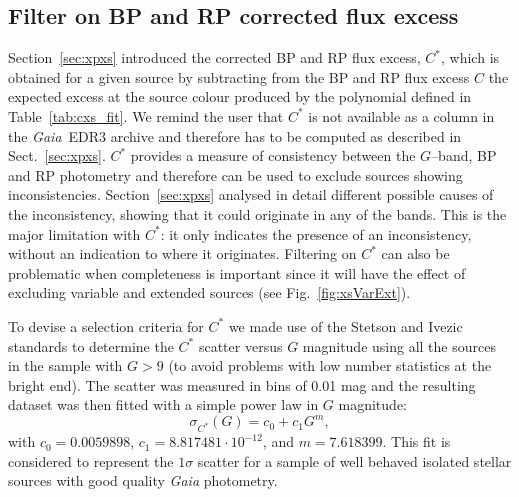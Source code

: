 \documentclass{aa}
\newcommand{\gaia}{\textit{Gaia}\xspace}
\newcommand{\gband}{$G$--band\xspace}
\newcommand{\cxs}{\ensuremath{C^{\ast}}\xspace}
\newcommand{\edr}{\gaia~EDR3\xspace}
\newcommand{\xp}{BP and RP\xspace}
\newcommand{\secname}{Sect.}
\newcommand{\secref}[1]{\secname~\ref{sec:#1}}
\newcommand{\asecref}[1]{Section~\ref{sec:#1}}
\newcommand{\figref}[1]{Fig.~\ref{fig:#1}}
\newcommand{\tabref}[1]{Table~\ref{tab:#1}}
\begin{document}
\subsection{Filter on \xp corrected flux excess}\label{sec:quality:cxs}

\asecref{xpxs} introduced the corrected \xp flux excess, \cxs, which is obtained for a given source by subtracting from the \xp flux excess $C$ \citep[see][]{Phot_DR2} the expected excess at the source colour produced by the polynomial defined in \tabref{cxs_fit}. We remind the user that \cxs is not available as a column in the \edr archive and therefore has to be computed as described in \secref{xpxs}. \cxs provides a measure of consistency between the \gband, BP and RP photometry and therefore can be used to exclude sources showing inconsistencies. \asecref{xpxs} analysed in detail different possible causes of the inconsistency, showing that it could originate in any of the bands. This is the major limitation with \cxs: it only indicates the presence of an inconsistency, without an indication to where it originates. Filtering on \cxs can also be problematic when completeness is important since it will have the effect of excluding variable and extended sources (see \figref{xsVarExt}).

To devise a selection criteria for \cxs we made use of the Stetson and Ivezic standards \citep{2000PASP..112..925S, Ive07} to determine the \cxs scatter versus $G$ magnitude using all the sources in the sample with $G>9$ (to avoid problems with low number statistics at the bright end). The scatter was measured in bins of 0.01 mag and the resulting dataset was then fitted with a simple power law in $G$ magnitude:
%
\begin{equation}
    \sigma_{C^{\ast}}(G)=c_0 + c_1G^m,\label{eq:cxss_fit}
\end{equation}
%
with $c_0=0.0059898$, $c_1=8.817481\cdot10^{-12}$, and $m=7.618399$. This fit is considered to represent the $1\sigma$ scatter for a sample of well behaved isolated stellar sources with good quality \gaia photometry.
\end{document}
